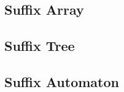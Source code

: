 \subsection{Suffix Array}
\raggedbottom
\subsection{Suffix Tree}
\raggedbottom
\subsection{Suffix Automaton}
\raggedbottom

